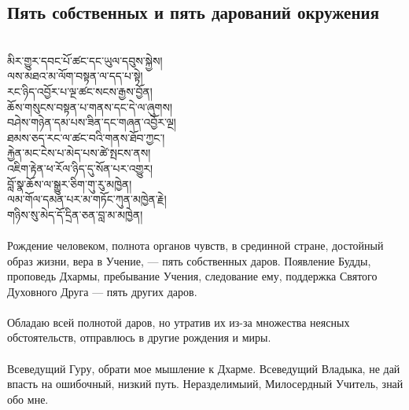 \subsection*{Пять собственных и пять дарований окружения}
\\
\ti
མིར་གྱུར་དབང་པོ་ཚང་དང་ཡུལ་དབུས་སྐྱེས།\\
ལས་མཐའ་མ་ལོག་བསྟན་ལ་དད་པ་སྟེ།\\
རང་ཉིད་འབྱོར་པ་ལྔ་ཚང་སངས་རྒྱས་བྱོན། \\
ཆོས་གསུངས་བསྟན་པ་གནས་དང་དེ་ལ་ཞུགས།\\
བཤེས་གཉེན་དམ་པས་ཟིན་དང་གཞན་འབྱོར་ལྔ།\\
ཐམས་ཅད་རང་ལ་ཚང་བའི་གནས་ཐོབ་ཀྱང༌།\\
རྐྱེན་མང་ངེས་པ་མེད་པས་ཚེ་སྤངས་ནས།\\
འཇིག་རྟེན་ཕ་རོལ་ཉིད་དུ་སོན་པར་འགྱུར།\\
བློ་སྣ་ཆོས་ལ་སྒྱུར་ཅིག་གུ་རུ་མཁྱེན།\\
ལམ་གོལ་དམན་པར་མ་གཏོང་ཀུན་མཁྱེན་རྗེ།\\
གཉིས་སུ་མེད་དོ་དྲིན་ཅན་བླ་མ་མཁྱེན།\\
\\
\ru
Рождение человеком, полнота органов чувств, в срединной стране,
достойный образ жизни, вера в Учение, —
пять собствен\-ных даров. Появление Будды,
проповедь Дхармы, пребывание Учения, следование ему,
поддержка Святого Духовного Друга — пять других даров.\\
 \\
Обладаю всей полнотой даров, но
утратив их из-за множества неясных обстоятельств,
отправлюсь в другие рождения и миры.\\
\\
Всеведущий Гуру, обрати мое мышление к Дхарме.
Всеведущий Владыка, не дай впасть на ошибочный, низкий путь.
Нераздели\-мыий, Милосердный Учитель, знай обо мне.

\newpage
